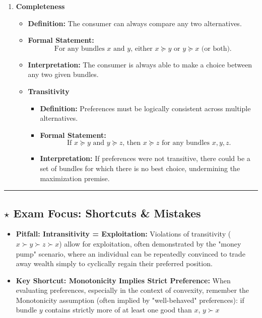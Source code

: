 \documentclass{article}
\begin{document}
\begin{enumerate}
    \item \textbf{Completeness}
    \begin{itemize}
        \item \textbf{Definition:} The consumer can always compare any two alternatives.
        \item \textbf{Formal Statement:} \[\text{For any bundles } x \text{ and } y \text{, either } x \succeq y \text{ or } y \succeq x \text{ (or both).}\]
        \item \textbf{Interpretation:} The consumer is always able to make a choice between any two given bundles.
    \end{itemize}
\begin{itemize}
\item \textbf{Transitivity}
    \begin{itemize}
        \item \textbf{Definition:} Preferences must be logically consistent across multiple alternatives.
        \item \textbf{Formal Statement:} \[\text{If } x \succeq y \text{ and } y \succeq z \text{, then } x \succeq z \text{ for any bundles } x, y, z.\]
        \item \textbf{Interpretation:} If preferences were not transitive, there could be a set of bundles for which there is no best choice, undermining the maximization premise.
    \end{itemize}
\end{itemize}
\end{enumerate}

\noindent\rule{\textwidth}{0.4pt}

\subsection*{$\star$ Exam Focus: Shortcuts \& Mistakes}

\begin{itemize}
    \item \textbf{Pitfall: Intransitivity = Exploitation:} Violations of transitivity ($x \succ y \succ z \succ x$) allow for exploitation, often demonstrated by the "money pump" scenario, where an individual can be repeatedly convinced to trade away wealth simply to cyclically regain their preferred position.
    \item \textbf{Key Shortcut: Monotonicity Implies Strict Preference:} When evaluating preferences, especially in the context of convexity, remember the Monotonicity assumption (often implied by "well-behaved" preferences): if bundle $y$ contains strictly more of at least one good than $x$, $y \succ x$
\end{itemize}
\end{document}

